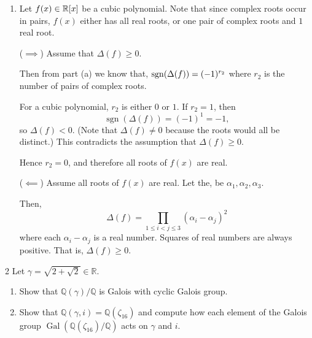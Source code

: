 \documentclass[12pt]{article}
\begin{document}
\begin{solution}
\begin{enumerate}
        \item[(b)] Let $f(x) \in \mathbb R[x]$ be a cubic polynomial. Note that since complex roots occur in pairs, $f(x)$ either has all real roots, or one pair of complex roots and $1$ real root. 
        
        ($\implies$) Assume that $\Delta(f) \geq 0$. 

        Then from part (a) we know that, $\operatorname{sgn}(\Delta(f)) = (-1)^{r_2}$ where $r_2$ is the number of pairs of complex roots. 

        For a cubic polynomial, $r_2$ is either $0$ or $1$. If $r_2 = 1$, then
        \[\operatorname{sgn}(\Delta(f)) = (-1)^1 = -1,\]
        so $\Delta(f) < 0$. (Note that $\Delta(f) \neq 0$ because the roots would all be distinct.)
        This contradicts the assumption that $\Delta(f) \ge 0$.

        Hence $r_2 = 0$, and therefore all roots of $f(x)$ are real.

        ($\impliedby$) Assume all roots of $f(x)$ are real. Let the, be $\alpha_1, \alpha_2, \alpha_3$. 

        Then, 
        \[\Delta(f) = \prod_{1 \leq i < j \leq 3}(\alpha_i - \alpha_j)^2\]
        where each $\alpha_i - \alpha_j$ is a real number. Squares of real numbers are always positive. That is, $\Delta(f) \geq 0$. 
    \end{enumerate}
\end{solution}

\newpage

\begin{problem}{2}
    Let $\gamma = \sqrt{2 + \sqrt{2}} \in \mathbb{R}$.

    \begin{enumerate}
        \item[(a)] Show that $\mathbb{Q}(\gamma)/\mathbb{Q}$ is Galois with cyclic Galois group.

        \item[(b)] Show that $\mathbb{Q}(\gamma, i) = \mathbb{Q}(\zeta_{16})$ and compute how each element of the Galois group $\operatorname{Gal}(\mathbb{Q}(\zeta_{16})/\mathbb{Q})$ acts on $\gamma$ and $i$.
    \end{enumerate}
\end{problem}
\end{document}
